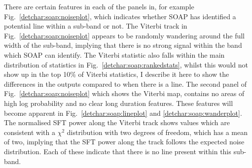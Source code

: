 %
There are certain features in each of the panels in, for example
Fig.~\ref{detchar:soap:noiseplot}, which indicates whether SOAP has identified
a potential line within a sub-band or not.  The Viterbi track in
Fig.~\ref{detchar:soap:noiseplot} appears to be randomly wandering around the
full width of the sub-band, implying that there is no strong signal within the
band which SOAP can identify.  The Viterbi statistic also falls within the main
distribution of statistics in Fig.~\ref{detchar:soap:rankedstats}, whilst this
would not~ show up in the top 10\% of Viterbi statistics, I
describe it here to show the differences in the outputs compared to when there
is a line.  The second panel of Fig.~\ref{detchar:soap:noiseplot} which shows
the Viterbi map, contains no areas of high log probability and no clear long
duration features. These features will become apparent in
Fig.~\ref{detchar:soap:lineplot} and \ref{detchar:soap:wanderplot}.  The
normalised \gls{SFT} power along the Viterbi track shows values which are
consistent with a $\chi^2$ distribution with two degrees of freedom, which has
a mean of two, implying that the \gls{SFT} power along the track follows the
expected noise distribution.  Each of these indicate that there is no line
present within this sub-band.
%
